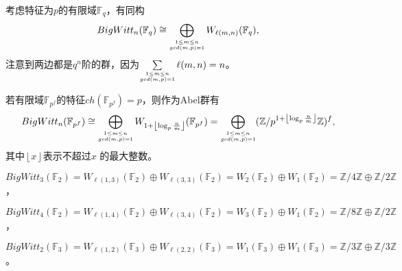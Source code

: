 {\color{blue}考虑特征为$p$的有限域$\mathbb{F}_q$，有同构\cite{Lauter1999A}
\[BigWitt_n(\mathbb{F}_{q}) \cong \bigoplus_{\scriptsize\substack{1\leq m\leq n \\ gcd(m,p)=1}} W_{\ell(m,n)}(\mathbb{F}_{q}),\]}
注意到两边都是$q^n$阶的群，因为$\sum\limits_{\scriptsize\substack{1\leq m\leq n \\ gcd(m,p)=1}} \ell(m,n) = n$。
\begin{corollary}
\label{cor:BW}
	若有限域$\mathbb{F}_{p^f}$的特征$ch(\mathbb{F}_{p^f})=p$，则作为Abel群有
	\[
	BigWitt_n(\mathbb{F}_{p^f})\cong \bigoplus_{\scriptsize\substack{1\leq m\leq n \\ gcd(m,p)=1}}W_{1+ \left \lfloor\log_p \frac{n}{m}  \right \rfloor}(\mathbb{F}_{p^f}) = \bigoplus_{\scriptsize\substack{1\leq m\leq n \\ gcd(m,p)=1}}(\mathbb{Z}/p^{1+ \left \lfloor\log_p \frac{n}{m}  \right \rfloor}\mathbb{Z})^f,
	\]
	其中$ \left \lfloor x \right \rfloor$表示不超过$x$
	的最大整数。
\end{corollary}
\begin{example}
	$BigWitt_3(\mathbb{F}_2)= W_{\ell(1,3)}(\mathbb{F}_2)\oplus W_{\ell(3,3)}(\mathbb{F}_2)=W_2(\mathbb{F}_2)\oplus W_1(\mathbb{F}_2)=\mathbb{Z}/4 \mathbb{Z}\oplus	\mathbb{Z}/2 \mathbb{Z}$，

	$BigWitt_4(\mathbb{F}_2)= W_{\ell(1,4)}(\mathbb{F}_2)\oplus W_{\ell(3,4)}(\mathbb{F}_2)=W_3(\mathbb{F}_2)\oplus W_1(\mathbb{F}_2)=\mathbb{Z}/8 \mathbb{Z}\oplus	\mathbb{Z}/2 \mathbb{Z}$，

	$BigWitt_2(\mathbb{F}_3)= W_{\ell(1,2)}(\mathbb{F}_3)\oplus W_{\ell(2,2)}(\mathbb{F}_3)=W_1(\mathbb{F}_3)\oplus W_1(\mathbb{F}_3)=\mathbb{Z}/3 \mathbb{Z}\oplus	\mathbb{Z}/3 \mathbb{Z}$。

\end{example}



























